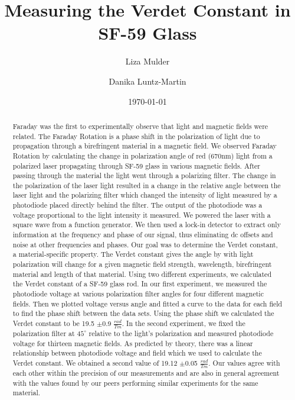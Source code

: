 \documentclass[prb,preprint]{revtex4-1}
\begin{document}

\title{Measuring the Verdet Constant in SF-59 Glass}


\author{Liza Mulder}


\author{Danika Luntz-Martin}


\date{\today}



\begin{abstract}

Faraday was the first to experimentally observe that light and magnetic fields were related. The Faraday Rotation is a phase shift in the polarization of light due to propagation through a birefringent material in a magnetic field. We observed Faraday Rotation by calculating the change in polarization angle of red (670nm) light from a polarized laser propagating through SF-59 glass in various magnetic fields. After passing through the material the light went through a polarizing filter. The change in the polarization of the laser light resulted in a change in the relative angle between the laser light and the polarizing filter which changed the intensity of light measured by a photodiode placed directly behind the filter. The output of the photodiode was a voltage proportional to the light intensity it measured. We powered the laser with a square wave from a function generator.  We then used a lock-in detector to extract only information at the frequency and phase of our signal, thus eliminating dc offsets and noise at other frequencies and phases. Our goal was to determine the Verdet constant, a material-specific property. The Verdet constant gives the angle by with light polarization will change for a given magnetic field strength, wavelength, birefringent material and length of that material. Using two different experiments, we calculated the Verdet constant of a SF-59 glass rod. In our first experiment, we measured the photodiode voltage at various polarization filter angles for four different magnetic fields. Then we plotted voltage versus angle and fitted a curve to the data for each field to find the phase shift between the data sets. Using the phase shift we calculated the Verdet constant to be 19.5 $\pm$0.9 $\frac{rad}{Tm}$. In the second experiment, we fixed the polarization filter at $45^{\circ}$ relative to the light's polarization and measured photodiode voltage for thirteen magnetic fields.  As predicted by theory, there was a linear relationship between photodiode voltage and field which we used to calculate the Verdet constant. We obtained a second value of 19.12 $\pm$0.05 $\frac{rad}{Tm}$. Our values agree with each other within the precision of our measurements and are also in general agreement with the values found by our peers performing similar experiments for the same material. 

\end{abstract}
\end{document}
